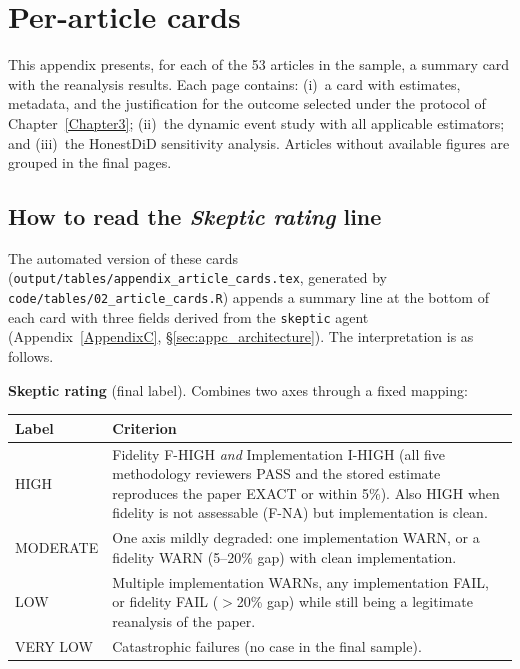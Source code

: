 \chapter{Per-article cards}
\label{AppendixB}

This appendix presents, for each of the 53 articles in the sample, a summary card with the reanalysis results. Each page contains: (i)~a card with estimates, metadata, and the justification for the outcome selected under the protocol of Chapter~\ref{Chapter3}; (ii)~the dynamic event study with all applicable estimators; and (iii)~the HonestDiD sensitivity analysis. Articles without available figures are grouped in the final pages.

\section*{How to read the \emph{Skeptic rating} line}

The automated version of these cards (\texttt{output/tables/appendix\_article\_cards.tex}, generated by \texttt{code/tables/02\_article\_cards.R}) appends a summary line at the bottom of each card with three fields derived from the \texttt{skeptic} agent (Appendix~\ref{AppendixC}, §\ref{sec:appc_architecture}). The interpretation is as follows.

\noindent\textbf{Skeptic rating} (final label). Combines two axes through a fixed mapping:

\begin{table}[H]
\centering
\footnotesize
\begin{tabularx}{\textwidth}{@{}l X@{}}
\toprule
\textbf{Label} & \textbf{Criterion} \\
\midrule
HIGH     & Fidelity F-HIGH \emph{and} Implementation I-HIGH (all five methodology reviewers PASS and the stored estimate reproduces the paper EXACT or within 5\%). Also HIGH when fidelity is not assessable (F-NA) but implementation is clean. \\
MODERATE & One axis mildly degraded: one implementation WARN, or a fidelity WARN (5--20\% gap) with clean implementation. \\
LOW      & Multiple implementation WARNs, any implementation FAIL, or fidelity FAIL ($>$20\% gap) while still being a legitimate reanalysis of the paper. \\
VERY LOW & Catastrophic failures (no case in the final sample). \\
\bottomrule
\end{tabularx}
\end{table}

